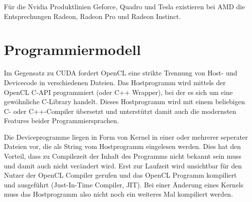 	    	Für die Nvidia Produktlinien Geforce, Quadro und Tesla existieren bei AMD die Entsprechungen Radeon, Radeon Pro und Radeon Instinct. 
	    	
		\section{Programmiermodell}
		Im Gegensatz zu CUDA fordert OpenCL eine strikte Trennung von Host- und Devicecode in verschiedenen Dateien. Das Hostprogramm wird mittels der OpenCL C-\Gls{API} programmiert (oder C++ Wrapper), bei der es sich um eine gewöhnliche C-Library handelt. Dieses Hostprogramm wird mit einem beliebigen C- oder C++-Compiler übersetzt und unterstützt damit auch die modernsten Features beider Programmiersprachen.
		
		Die Deviceprogramme liegen in Form von \Gls{Kernel} in einer oder mehrerer seperater Dateien vor, die als String vom Hostprogramm eingelesen werden. Dies hat den Vorteil, dass zu Compilezeit der Inhalt des Programms nicht bekannt sein muss und damit auch nicht verändert wird. Erst zur Laufzeit wird unsichtbar für den Nutzer der OpenCL Compiler gerufen und das OpenCL Programm kompiliert und ausgeführt (Just-In-Time Compiler, JIT). Bei einer Änderung eines \Glspl{Kernel} muss das Hostprogramm also nicht noch ein weiteres Mal kompiliert werden.
		
